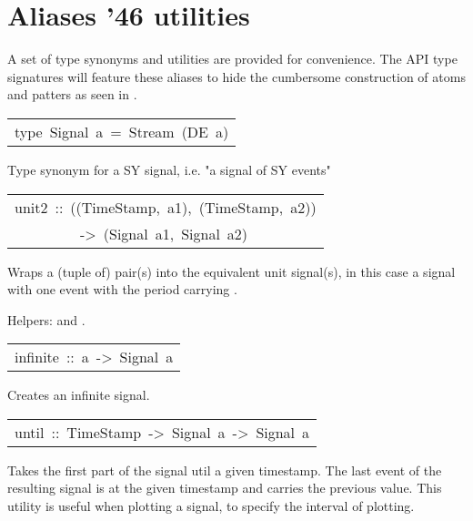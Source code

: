 \section{Aliases {\char '46} utilities}
A set of type synonyms and utilities are provided for
 convenience. The API type signatures will feature these aliases
 to hide the cumbersome construction of atoms and patters as seen
 in .\par

\begin{haddockdesc}
\item[\begin{tabular}{@{}l}
type\ Signal\ a\ =\ Stream\ (DE\ a)
\end{tabular}]\haddockbegindoc
Type synonym for a SY signal, i.e. "a signal of SY events"\par

\end{haddockdesc}
\begin{haddockdesc}
\item[\begin{tabular}{@{}l}
unit2\ ::\ ((TimeStamp,\ a1),\ (TimeStamp,\ a2))\\\ \ \ \ \ \ \ \ \ ->\ (Signal\ a1,\ Signal\ a2)
\end{tabular}]\haddockbegindoc
Wraps a (tuple of) pair(s)  into the equivalent
 unit signal(s), in this case a signal with one event with the
 period  carrying .\par
Helpers:  and .\par

\end{haddockdesc}
\begin{haddockdesc}
\item[\begin{tabular}{@{}l}
infinite\ ::\ a\ ->\ Signal\ a
\end{tabular}]\haddockbegindoc
Creates an infinite signal.\par

\end{haddockdesc}
\begin{haddockdesc}
\item[\begin{tabular}{@{}l}
until\ ::\ TimeStamp\ ->\ Signal\ a\ ->\ Signal\ a
\end{tabular}]\haddockbegindoc
Takes the first part of the signal util a given timestamp. The
 last event of the resulting signal is at the given timestamp and
 carries the previous value. This utility is useful when plotting
 a signal, to specify the interval of plotting.\par

\end{haddockdesc}

